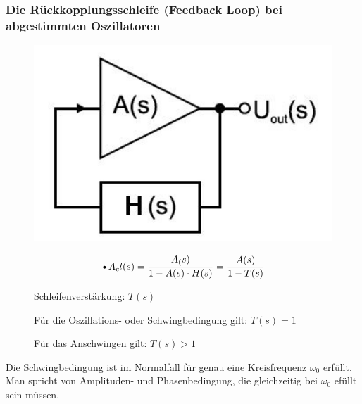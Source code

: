 \subsubsection{Die Rückkopplungsschleife (Feedback Loop) bei abgestimmten Oszillatoren}
\begin{figure}[h!]
	\begin{minipage}{0.3\textwidth} 
	  \includegraphics[width=1.0\textwidth]{images/Blockdiagramm_Oszillator}
	\end{minipage}
	\begin{minipage}{0.4\textwidth}
	  \begin{equation*}
        \text{\textbullet }A_cl(s) =\frac{A_(s)}{1-A(s) \cdot H(s)} = \frac{A(s)}{1-T(s)}
      \end{equation*}
      \begin{compactitem}
        \item Schleifenverstärkung: $T(s)$
        \item Für die Oszillations- oder Schwingbedingung gilt: $T(s)=1$
        \item Für das Anschwingen gilt: $T(s)>1$
      \end{compactitem}
	\end{minipage}
\end{figure}
\raggedright
Die Schwingbedingung ist im Normalfall für genau eine Kreisfrequenz $\omega _0$ erfüllt. Man       spricht von Amplituden- und Phasenbedingung, die gleichzeitig bei $\omega _0$ efüllt sein müssen.

\FloatBarrier
